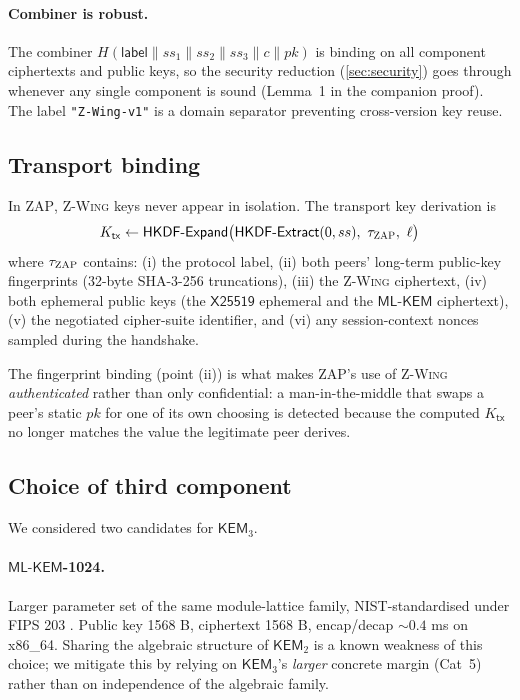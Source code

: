 \documentclass[11pt,a4paper]{article}
\theoremstyle{definition}
\theoremstyle{remark}
\newcommand{\KEM}{\ensuremath{\mathsf{KEM}}}
\newcommand{\zwing}{\textsc{Z-Wing}}
\newcommand{\zap}{\textsc{ZAP}}
\newcommand{\mlkem}{\ensuremath{\mathsf{ML\text{-}KEM}}}
\newcommand{\xtf}{\ensuremath{\mathsf{X25519}}}
\newcommand{\hkdf}{\ensuremath{\mathsf{HKDF}}}
\newcommand{\transcript}{\ensuremath{\tau}}
\begin{document}
\paragraph{Combiner is robust.}
The combiner $H(\mathsf{label} \parallel ss_1 \parallel ss_2 \parallel ss_3 \parallel c \parallel pk)$
is binding on all component ciphertexts and public keys, so the security
reduction (\cref{sec:security}) goes through whenever any single component is
sound (Lemma~1 in the companion proof). The label
\texttt{"Z-Wing-v1"} is a domain separator preventing cross-version key reuse.

\subsection{Transport binding}\label{sec:binding}

In \zap{}, \zwing{} keys never appear in isolation. The transport key
derivation is
\[
K_{\mathsf{tx}} \gets \hkdf\text{-}\mathsf{Expand}\bigl(\hkdf\text{-}\mathsf{Extract}(0, ss),\ \transcript_{\zap},\ \ell\bigr)
\]
where $\transcript_{\zap}$ contains: (i) the protocol label, (ii) both peers'
long-term public-key fingerprints (32-byte SHA-3-256 truncations), (iii) the
\zwing{} ciphertext, (iv) both ephemeral public keys (the \xtf{} ephemeral and
the \mlkem{} ciphertext), (v) the negotiated cipher-suite identifier, and
(vi) any session-context nonces sampled during the handshake.

The fingerprint binding (point (ii)) is what makes \zap{}'s use of \zwing{}
\emph{authenticated} rather than only confidential: a man-in-the-middle that
swaps a peer's static $pk$ for one of its own choosing is detected because
the computed $K_{\mathsf{tx}}$ no longer matches the value the legitimate
peer derives.

\subsection{Choice of third component}\label{sec:choice}

We considered two candidates for $\KEM_3$.

\paragraph{\mlkem{}-1024.} Larger parameter set of the same module-lattice
family, NIST-standardised under FIPS 203 \cite{nistmlkem}. Public key
1568 B, ciphertext 1568 B, encap/decap $\sim 0.4$ ms on x86\_64. Sharing the
algebraic structure of $\KEM_2$ is a known weakness of this choice; we
mitigate this by relying on $\KEM_3$'s \emph{larger} concrete margin (Cat~5)
rather than on independence of the algebraic family.
\end{document}
